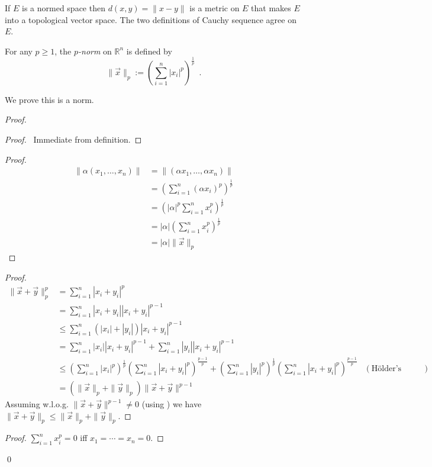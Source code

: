\begin{prop}
If $E$ is a normed space then $d(x,y) = \| x - y \|$ is a metric on $E$ that makes $E$ into a topological vector space. The two definitions of Cauchy sequence agree on $E$.
\end{prop}

\begin{df}[$p$-norm]
For any $p \geq 1$, the \emph{$p$-norm} on $\mathbb{R}^n$ is defined by
\[ \| \vec{x} \|_p := \left( \sum_{i=1}^n |x_i|^p \right)^{\frac{1}{p}} \enspace . \]

We prove this is a norm.
\end{df}

\begin{proof}
\pf
{}
\begin{proof}
	\pf\ Immediate from definition.
\end{proof}
\begin{proof}
	\pf
	\begin{align*}
		\| \alpha (x_1, \ldots, x_n) \|
		& = \| (\alpha x_1, \ldots, \alpha x_n) \| \\
		& = \left( \sum_{i=1}^n (\alpha x_i)^p \right)^{\frac{1}{p}} \\
		& = \left( |\alpha|^p \sum_{i=1}^n x_i^p \right)^{\frac{1}{p}} \\
		& = |\alpha| \left( \sum_{i=1}^n x_i^p \right)^{\frac{1}{p}} \\
		& = |\alpha| \|\vec{x}\|_p
	\end{align*}
\end{proof}
\begin{proof}
	\pf
	\begin{align*}
		\| \vec{x} + \vec{y} \|_p^p
		& = \sum_{i=1}^n |x_i + y_i|^p \\
		& = \sum_{i=1}^n |x_i + y_i| |x_i + y_i|^{p-1} \\
		& \leq \sum_{i=1}^n (|x_i| + |y_i|) |x_i + y_i|^{p-1} \\
		& = \sum_{i=1}^n |x_i| |x_i + y_i|^{p-1} + \sum_{i=1}^n |y_i| |x_i + y_i|^{p-1} \\
		& \leq \left( \sum_{i=1}^n |x_i|^p \right)^{\frac{1}{p}} \left( \sum_{i=1}^n |x_i + y_i|^p \right)^{\frac{p-1}{p}} + \left( \sum_{i=1}^n |y_i|^p \right)^{\frac{1}{p}} \left( \sum_{i=1}^n |x_i + y_i|^p \right)^{\frac{p-1}{p}} & (\text{H\"{o}lder's Inequality}) \\
		& = ( \|\vec{x}\|_p + \|\vec{y}\|_p) \| \vec{x} + \vec{y} \|^{p-1}
	\end{align*}
	Assuming w.l.o.g. $\| \vec{x} + \vec{y} \|^{p-1} \neq 0$ (using ) we have $\| \vec{x} + \vec{y} \|_p \leq \| \vec{x} \|_p + \| \vec{y} \|_p$. 	
\end{proof}
\begin{proof}
	\pf $\sum_{i=1}^n x_i^p = 0$ iff $x_1 = \cdots = x_n  = 0$.
\end{proof}
\qed
\end{proof}


